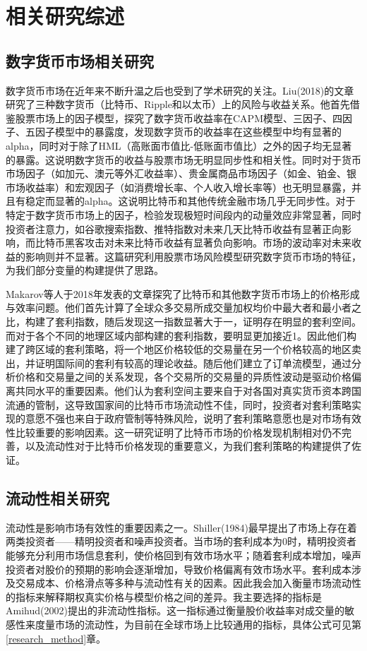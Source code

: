 \chapter{相关研究综述}
\section{数字货币市场相关研究}
\par{数字货币市场在近年来不断升温之后也受到了学术研究的关注。Liu(2018)的文章研究了三种数字货币（比特币、Ripple和以太币）上的风险与收益关系\cite{NBERw24877}。他首先借鉴股票市场上的因子模型，探究了数字货币收益率在CAPM模型、三因子、四因子、五因子模型中的暴露度，发现数字货币的收益率在这些模型中均有显著的alpha，同时对于除了HML（高账面市值比-低账面市值比）之外的因子均无显著的暴露。这说明数字货币的收益与股票市场无明显同步性和相关性。同时对于货币市场因子（如加元、澳元等外汇收益率）、贵金属商品市场因子（如金、铂金、银市场收益率）和宏观因子（如消费增长率、个人收入增长率等）也无明显暴露，并且有稳定而显著的alpha。这说明比特币和其他传统金融市场几乎无同步性。对于特定于数字货币市场上的因子，检验发现极短时间段内的动量效应非常显著，同时投资者注意力，如谷歌搜索指数、推特指数对未来几天比特币收益有显著正向影响，而比特币黑客攻击对未来比特币收益有显著负向影响。市场的波动率对未来收益的影响则并不显著。这篇研究利用股票市场风险模型研究数字货币市场的特征，为我们部分变量的构建提供了思路。}
\par{Makarov等人于2018年发表的文章探究了比特币和其他数字货币市场上的价格形成与效率问题\cite{Makarov-2018}。他们首先计算了全球众多交易所成交量加权均价中最大者和最小者之比，构建了套利指数，随后发现这一指数显著大于一，证明存在明显的套利空间。而对于各个不同的地理区域内部构建的套利指数，要明显更加接近1。因此他们构建了跨区域的套利策略，将一个地区价格较低的交易量在另一个价格较高的地区卖出，并证明国际间的套利有较高的理论收益。随后他们建立了订单流模型，通过分析价格和交易量之间的关系发现，各个交易所的交易量的异质性波动是驱动价格偏离共同水平的重要因素。他们认为套利空间主要来自于对各国对真实货币资本跨国流通的管制，这导致国家间的比特币市场流动性不佳，同时，投资者对套利策略实现的意愿不强也来自于政府管制等特殊风险，说明了套利策略意愿也是对市场有效性比较重要的影响因素。这一研究证明了比特币市场的价格发现机制相对仍不完善，以及流动性对于比特币价格发现的重要意义，为我们套利策略的构建提供了佐证。}

\section{流动性相关研究}
\par{流动性是影响市场有效性的重要因素之一。Shiller(1984)最早提出了市场上存在着两类投资者——精明投资者和噪声投资者\cite{Rober-1984}。当市场的套利成本为0时，精明投资者能够充分利用市场信息套利，使价格回到有效市场水平；随着套利成本增加，噪声投资者对股价的预期的影响会逐渐增加，导致价格偏离有效市场水平。套利成本涉及交易成本、价格滑点等多种与流动性有关的因素。因此我会加入衡量市场流动性的指标来解释期权真实价格与模型价格之间的差异。我主要选择的指标是Amihud(2002)提出的非流动性指标\cite{Yako-2002}。这一指标通过衡量股价收益率对成交量的敏感性来度量市场的流动性，为目前在全球市场上比较通用的指标，具体公式可见第\ref{research_method}章。}
